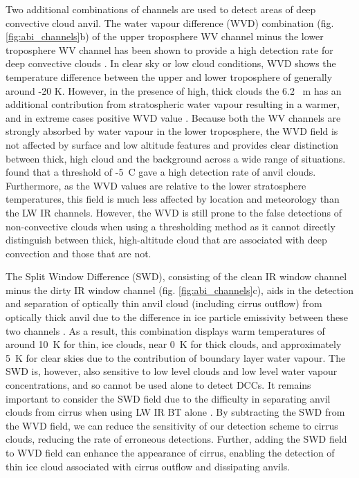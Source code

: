 \documentclass[amt, manuscript]{copernicus}
\begin{document}
Two additional combinations of channels are used to detect areas of deep convective cloud anvil. 
The water vapour difference (WVD) combination (fig. \ref{fig:abi_channels}b) of the upper troposphere WV channel minus the lower troposphere WV channel has been shown to provide a high detection rate for deep convective clouds \citep{muller_role_2018, muller_novel_2019}.
In clear sky or low cloud conditions, WVD shows the temperature difference between the upper and lower troposphere of generally around -20 K. 
However, in the presence of high, thick clouds the 6.2 \unit{\mu m} has an additional contribution from stratospheric water vapour resulting in a warmer, and in extreme cases positive WVD value \citep{schmetz_monitoring_1997}.
Because both the WV channels are strongly absorbed by water vapour in the lower troposphere, the WVD field is not affected by surface and low altitude features and provides clear distinction between thick, high cloud and the background across a wide range of situations.
\citet{muller_novel_2019} found that a threshold of -5~\textdegree C gave a high detection rate of anvil clouds.
Furthermore, as the WVD values are relative to the lower stratosphere temperatures, this field is much less affected by location and meteorology than the LW IR channels.
However, the WVD is still prone to the false detections of non-convective clouds when using a thresholding method as it cannot directly distinguish between thick, high-altitude cloud that are associated with deep convection and those that are not.

The Split Window Difference (SWD), consisting of the clean IR window channel minus the dirty IR window channel (fig. \ref{fig:abi_channels}c), aids in the detection and separation of optically thin anvil cloud (including cirrus outflow) from optically thick anvil due to the difference in ice particle emissivity between these two channels \citep{heidinger_gazing_2009}.
As a result, this combination displays warm temperatures of around 10~\unit{K} for thin, ice clouds, near 0~\unit{K} for thick clouds, and approximately 5~\unit{K} for clear skies due to the contribution of boundary layer water vapour.
The SWD is, however, also sensitive to low level clouds and low level water vapour concentrations, and so cannot be used alone to detect DCCs.
It remains important to consider the SWD field due to the difficulty in separating anvil clouds from cirrus when using LW IR BT alone \citep{hong_detection_2005}. 
By subtracting the SWD from the WVD field, we can reduce the sensitivity of our detection scheme to cirrus clouds, reducing the rate of erroneous detections.
Further, adding the SWD field to WVD field can enhance the appearance of cirrus, enabling the detection of thin ice cloud associated with cirrus outflow and dissipating anvils.
\end{document}
